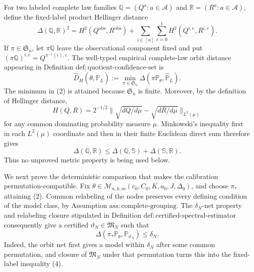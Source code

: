 For two labeled complete law families \(\mathbb Q=(Q^a:a\in\mathcal A)\) and \(\mathbb R=(R^a:a\in\mathcal A)\), define the fixed-label product Hellinger distance
\[
 \Delta(\mathbb Q,\mathbb R)^2
 =H^2(Q^{\mathrm{obs}},R^{\mathrm{obs}})
  +\sum_{i\in[n]}\sum_{e=0}^1 H^2(Q^{i,e},R^{i,e}).
\tag{1}
\]
If \(\pi\in\mathfrak S_n\), let \(\pi\mathbb Q\) leave the observational component fixed and put \((\pi\mathbb Q)^{i,e}=Q^{\pi^{-1}(i),e}\).  The well-typed empirical complete-law orbit distance appearing in Definition \(\mathrm{def:quotient\text{-}confidence\text{-}set}\) is
\[
 \widehat D_H(\theta,\widehat{\mathbb P}_L)
 :=\min_{\pi\in\mathfrak S_n}
       \Delta(\pi\mathbb P_\theta,\widehat{\mathbb P}_L).
\tag{2}
\]
The minimum in (2) is attained because \(\mathfrak S_n\) is finite.  Moreover, by the definition of Hellinger distance,
\[
 H(Q,R)=2^{-1/2}\lVert \sqrt{dQ/d\mu}-\sqrt{dR/d\mu}\rVert_{L^2(\mu)}
\]
for any common dominating probability measure \(\mu\).  Minkowski's inequality first in each \(L^2(\mu)\) coordinate and then in their finite Euclidean direct sum therefore gives
\[
 \Delta(\mathbb Q,\mathbb R)
 \leq \Delta(\mathbb Q,\mathbb S)+\Delta(\mathbb S,\mathbb R).
\tag{3}
\]
Thus no unproved metric property is being used below.

We next prove the deterministic comparison that makes the calibration permutation-compatible.  Fix \(\theta\in\mathcal M_{n,k,m}(c_0,C_0,K,a_0,J,\Delta_0)\), and choose \(\pi_*\) attaining (2).  Common relabeling of the nodes preserves every defining condition of the model class, by Assumption \(\mathrm{ass:complete\text{-}grouping}\).  The \(\delta_N\)-net property and relabeling closure stipulated in Definition \(\mathrm{def:certified\text{-}spectral\text{-}estimator}\) consequently give a certified \(\vartheta_N\in\mathfrak M_N\) such that
\[
 \Delta(\pi_*\mathbb P_\theta,\mathbb P_{\vartheta_N})\leq\delta_N.
\tag{4}
\]
Indeed, the orbit net first gives a model within \(\delta_N\) after some common permutation, and closure of \(\mathfrak M_N\) under that permutation turns this into the fixed-label inequality (4).


